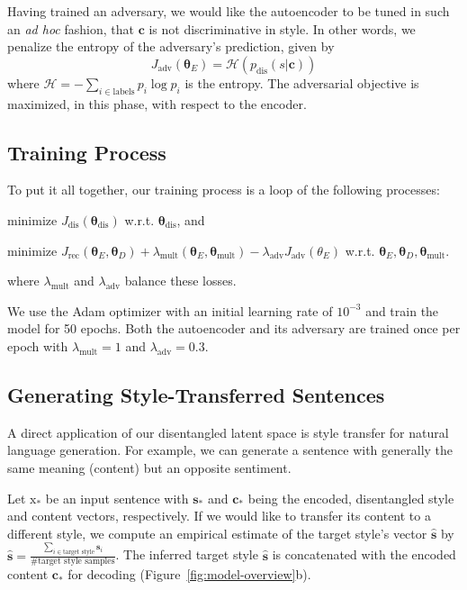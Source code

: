 \documentclass[11pt,a4paper]{article}
\newcommand{\rmx}{\mathrm x}
\begin{document}
Having trained an adversary, we would like the autoencoder to be tuned in such an \textit{ad hoc} fashion, that $\bm c$ is not discriminative in style. In other words, we penalize the entropy of the adversary's prediction, given by
\begin{equation}
	J_\text{adv}(\bm\theta_E)=\mathcal{H}(p_\text{dis}(s|\bm c))
\end{equation}
where $\mathcal{H}=-\sum_{i\in\text{labels}}p_i\log p_i$ is the entropy. The adversarial objective is maximized, in this phase, with respect to the encoder.



\subsection{Training Process}

To put it all together, our training process is a loop of the following processes:
\begin{compactenum}
	\item minimize $J_\text{dis}(\bm\theta_\text{dis})$ w.r.t. $\bm\theta_\text{dis}$, and
	\item minimize $J_\text{rec}(\bm\theta_E, \bm\theta_D) + \lambda_\text{mult}(\bm\theta_E,\bm\theta_\text{mult}) -\lambda_\text{adv}
		J_\text{adv}(\theta_E)$ w.r.t. $\bm\theta_E, \bm\theta_D, \bm\theta_\text{mult}$.
\end{compactenum}
where $\lambda_\text{mult}$ and $\lambda_\text{adv}$ balance these losses.

We use the Adam optimizer \cite{kingma2014adam} with an initial learning rate of $10^{-3}$ and train the model for 50 epochs. Both the autoencoder and its adversary are trained once per epoch with $\lambda_\text{mult} = 1$ and $\lambda_\text{adv} = 0.3$.

\subsection{Generating Style-Transferred Sentences} \label{ss:prediction}

A direct application of our disentangled latent space is style transfer for natural language generation. For example, we can generate a sentence with generally the same meaning (content) but an opposite sentiment.

Let $\rmx_*$ be an input sentence with $\bm s_*$ and $\bm c_*$ being the encoded, disentangled style and content vectors, respectively. If we would like to transfer its content to a different style, we compute an empirical estimate of the target style's vector $\hat{\bm s}$ by
$\hat{\bm s}=\frac{\sum_{i\in\text{target style}}\bm s_i}{\text{\# target style samples}}$. The inferred target style $\hat{\bm s}$ is concatenated with the encoded content $\bm c_*$ for decoding (Figure~\ref{fig:model-overview}b).
\end{document}
